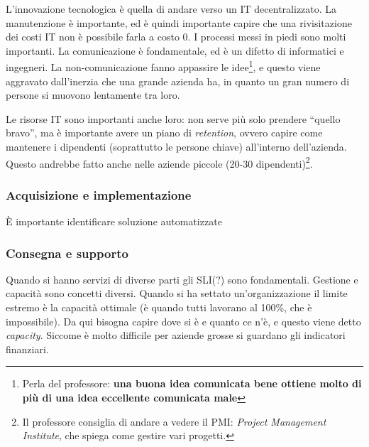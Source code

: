 L'innovazione tecnologica è quella di andare verso un IT decentralizzato. La 
manutenzione è importante, ed è quindi importante capire che una rivisitazione 
dei costi IT non è possibile farla a costo 0. I processi messi in piedi sono 
molti importanti. La comunicazione è fondamentale, ed è un difetto di 
informatici e ingegneri. La non-comunicazione fanno appassire le 
idee\footnote{Perla del professore: \textbf{una buona idea comunicata bene 
ottiene molto di più di una idea eccellente comunicata male}}, e questo viene 
aggravato dall'inerzia che una grande azienda ha, in quanto un gran numero di 
persone si muovono lentamente tra loro.

Le risorse IT sono importanti anche loro: non serve più solo prendere ``quello 
bravo'', ma è importante avere un piano di \textit{retention}, ovvero capire 
come mantenere i dipendenti (soprattutto le persone chiave) all'interno 
dell'azienda. Questo andrebbe fatto anche nelle aziende piccole (20-30 
dipendenti)\footnote{Il professore consiglia di andare a vedere il PMI: 
\textit{Project Management Institute}, che spiega come gestire vari progetti.}.

\subsubsection{Acquisizione e implementazione}

È importante identificare soluzione automatizzate 


\subsubsection{Consegna e supporto}

Quando si hanno servizi di diverse parti gli SLI(?) sono fondamentali.
Gestione e capacità sono concetti diversi. Quando si ha settato 
un'organizzazione il limite estremo è la capacità ottimale (è quando tutti 
lavorano al 100\%, che è impossibile). Da qui bisogna capire dove si è e quanto 
ce n'è, e questo viene detto \textit{capacity}. Siccome è molto difficile per 
aziende grosse si guardano gli indicatori finanziari.
